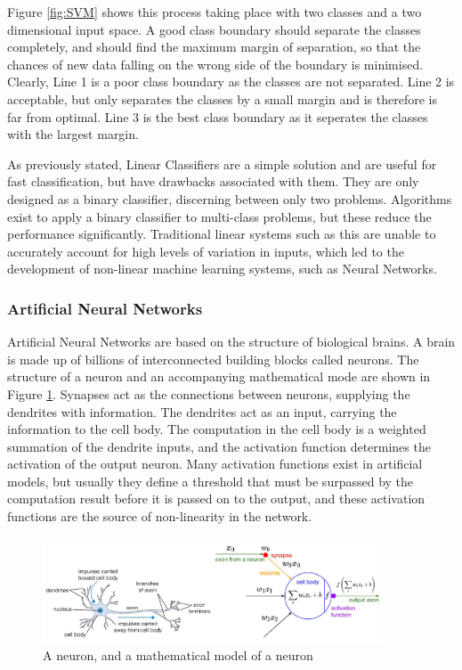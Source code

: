 \documentclass[12pt]{article}
\begin{document}
Figure \ref{fig:SVM} shows this process taking place with two classes and a two dimensional input space. A good class boundary should separate the classes completely, and should find the maximum margin of separation, so that the chances of new data falling on the wrong side of the boundary is minimised. Clearly, Line 1 is a poor class boundary as the classes are not separated. Line 2 is acceptable, but only separates the classes by a small margin and is therefore is far from optimal. Line 3 is the best class boundary as it seperates the classes with the largest margin.

As previously stated, Linear Classifiers are a simple solution and are useful for fast classification, but have drawbacks associated with them. They are only designed as a binary classifier, discerning between only two problems. Algorithms exist to apply a binary classifier to multi-class problems, but these reduce the performance significantly. Traditional linear systems such as this are unable to accurately account for high levels of variation in inputs, which led to the development of non-linear machine learning systems, such as Neural Networks.

\subsubsection{Artificial Neural Networks}
\label{sec:Background-ML-NN}

Artificial Neural Networks are based on the structure of biological brains. A brain is made up of billions of interconnected building blocks called neurons. The structure of a neuron and an accompanying mathematical mode are shown in Figure \ref{fig:neuron}. Synapses act as the connections between neurons, supplying the dendrites with information. The dendrites act as an input, carrying the information to the cell body. The computation in the cell body is a weighted summation of the dendrite inputs, and the activation function determines the activation of the output neuron\cite{neuron}. Many activation functions exist in artificial models, but usually they define a threshold that must be surpassed by the computation result before it is passed on to the output, and these activation functions are the source of non-linearity in the network.

\begin{figure}[H]
\centering
\includegraphics[width=0.9\textwidth]{figures/neuron.png}
\caption{A neuron, and a mathematical model of a neuron\cite{neuron}}
\label{fig:neuron}
\end{figure}
\end{document}
